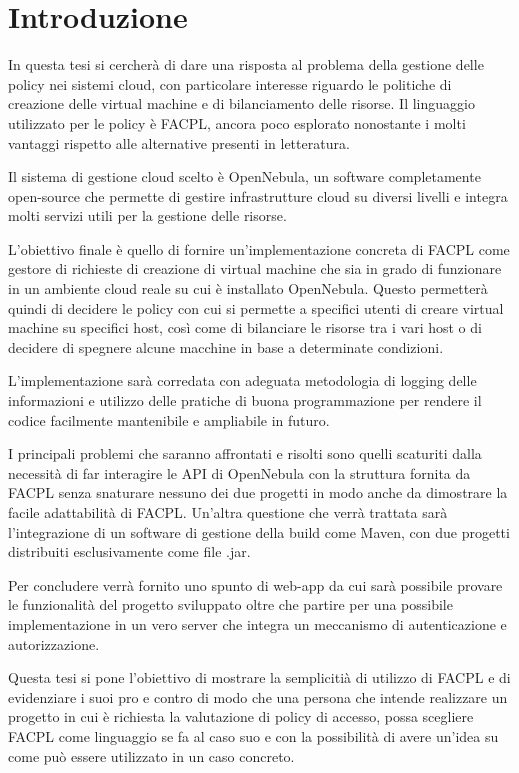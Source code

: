 
\chapter{Introduzione}
In questa tesi si cercherà di dare una risposta al problema della gestione delle policy nei sistemi cloud, con particolare interesse riguardo le politiche di creazione delle virtual machine e di bilanciamento delle risorse. Il linguaggio utilizzato per le policy è FACPL, ancora poco esplorato nonostante i molti vantaggi rispetto alle alternative presenti in letteratura.\par
Il sistema di gestione cloud scelto è OpenNebula, un software completamente open-source che permette di gestire infrastrutture cloud su diversi livelli e integra molti servizi utili per la gestione delle risorse.\par
L'obiettivo finale è quello di fornire un'implementazione concreta di FACPL come gestore di richieste di creazione di virtual machine che sia in grado di funzionare in un ambiente cloud reale su cui è installato OpenNebula. Questo permetterà quindi di decidere le policy con cui si permette a specifici utenti di creare virtual machine su specifici host, così come di bilanciare le risorse tra i vari host o di decidere di spegnere alcune macchine in base a determinate condizioni.\par
L'implementazione sarà corredata con adeguata metodologia di logging delle informazioni e utilizzo delle pratiche di buona programmazione per rendere il codice facilmente mantenibile e ampliabile in futuro.\par
I principali problemi che saranno affrontati e risolti sono quelli scaturiti dalla necessità di far interagire le API di OpenNebula con la struttura fornita da FACPL senza snaturare nessuno dei due progetti in modo anche da dimostrare la facile adattabilità di FACPL. Un'altra questione che verrà trattata sarà l'integrazione di un software di gestione della build come Maven, con due progetti distribuiti esclusivamente come file .jar.\par
Per concludere verrà fornito uno spunto di web-app da cui sarà possibile provare le funzionalità del progetto sviluppato oltre che partire per una possibile implementazione in un vero server che integra un meccanismo di autenticazione e autorizzazione.\par
Questa tesi si pone l'obiettivo di mostrare la semplicitià di utilizzo di FACPL e di evidenziare i suoi pro e contro di modo che una persona che intende realizzare un progetto in cui è richiesta la valutazione di policy di accesso, possa scegliere FACPL come linguaggio se fa al caso suo e con la possibilità di avere un'idea su come può essere utilizzato in un caso concreto.
